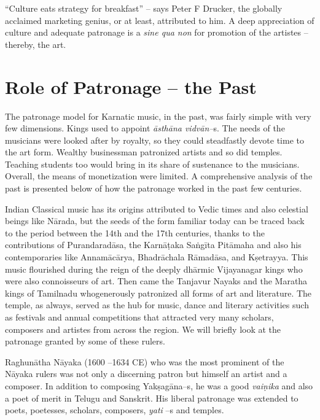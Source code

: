 “Culture eats strategy for breakfast” – says Peter F Drucker, the globally acclaimed marketing genius, or at least, attributed to him. A deep appreciation of culture and adequate patronage is a \textit{sine qua non} for promotion of the artistes – thereby, the art.

\vspace{-.4cm}

\section*{Role of Patronage – the Past}

\vspace{-.2cm}

The patronage model for Karnatic music, in the past, was fairly simple with very few dimensions. Kings used to appoint \textit{āsthāna vidvān–}s. The needs of the musicians were looked after by royalty, so they could steadfastly devote time to the art form. Wealthy businessman patronized artists and so did temples. Teaching students too would bring in its share of sustenance to the musicians. Overall, the means of monetization were limited. A comprehensive analysis of the past is presented below of how the patronage worked in the past few centuries.

Indian Classical music has its origins attributed to Vedic times and also celestial beings like Nārada, but the seeds of the form familiar today can be traced back to the period between the 14th and the 17th centuries, thanks to the contributions of Purandaradāsa, the Karnāṭaka Saṅgīta Pitāmaha and also his contemporaries like Annamācārya, Bhadrāchala Rāmadāsa, and Kṣetrayya. This music flourished during the reign of the deeply dhārmic Vijayanagar kings who were also connoisseurs of art. Then came the Tanjavur Nayaks and the Maratha kings of Tamilnadu whogenerously patronized all forms of art and literature. The temple, as always, served as the hub for music, dance and literary activities such as festivals and annual competitions that attracted very many scholars, composers and artistes from across the region. We will briefly look at the patronage granted by some of these rulers.

Raghunātha Nāyaka (1600 –1634 CE) who was the most prominent of the Nāyaka rulers was not only a discerning patron but himself an artist and a composer. In addition to composing Yakṣagāna–s, he was a good \textit{vaiṇika} and also a poet of merit in Telugu and Sanskrit. His liberal patronage was extended to poets, poetesses, scholars, composers, \textit{yati} –s and temples.

